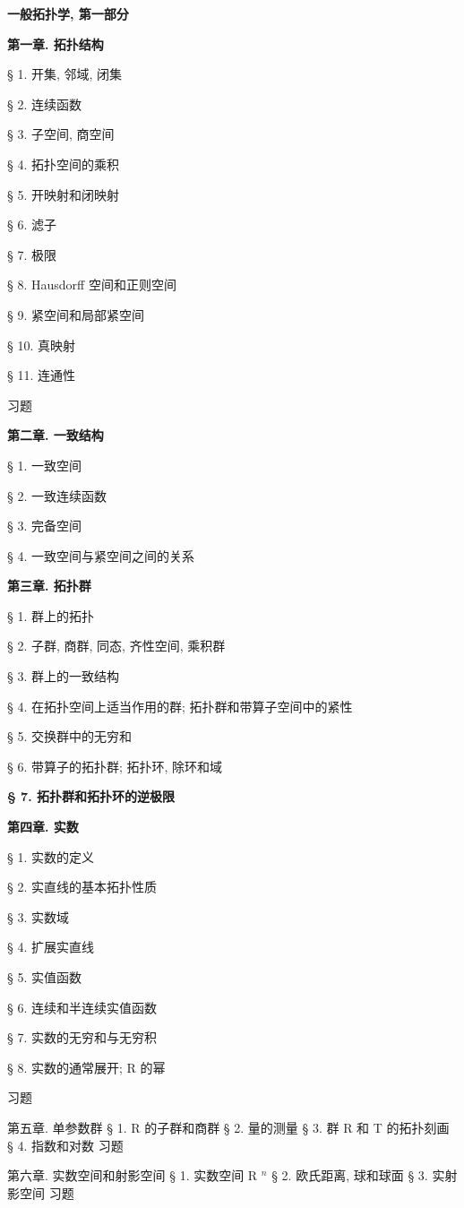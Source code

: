 \textbf{一般拓扑学, 第一部分}

\textbf{第一章. 拓扑结构}

§ 1. 开集, 邻域, 闭集

§ 2. 连续函数

§ 3. 子空间, 商空间

§ 4. 拓扑空间的乘积

§ 5. 开映射和闭映射

§ 6. 滤子

§ 7. 极限

§ 8. Hausdorff 空间和正则空间

§ 9. 紧空间和局部紧空间

§ 10. 真映射

§ 11. 连通性

习题

\textbf{第二章. 一致结构}

§ 1. 一致空间

§ 2. 一致连续函数

§ 3. 完备空间

§ 4. 一致空间与紧空间之间的关系

\textbf{第三章. 拓扑群}

§ 1. 群上的拓扑

§ 2. 子群, 商群, 同态, 齐性空间, 乘积群

§ 3. 群上的一致结构

§ 4. 在拓扑空间上适当作用的群; 拓扑群和带算子空间中的紧性

§ 5. 交换群中的无穷和

§ 6. 带算子的拓扑群; 拓扑环, 除环和域

\textbf{§ 7. 拓扑群和拓扑环的逆极限}

\textbf{第四章. 实数}

§ 1. 实数的定义

§ 2. 实直线的基本拓扑性质

§ 3. 实数域

§ 4. 扩展实直线

§ 5. 实值函数

§ 6. 连续和半连续实值函数

§ 7. 实数的无穷和与无穷积

§ 8. 实数的通常展开; R 的幂

习题

第五章. 单参数群 § 1. R 的子群和商群 § 2. 量的测量 § 3. 群 R 和 T 的拓扑刻画 § 4. 指数和对数 习题

第六章. 实数空间和射影空间 § 1. 实数空间 R \(^{n}\) § 2. 欧氏距离, 球和球面 § 3. 实射影空间 习题

